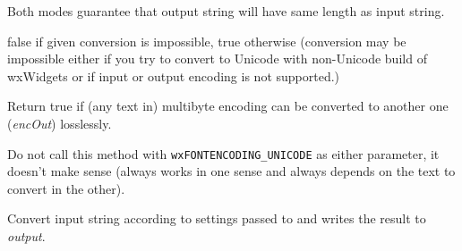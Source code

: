 \begin{twocollist}\itemsep=0pt
\end{twocollist}

Both modes guarantee that output string will have same length
as input string.


false if given conversion is impossible, true otherwise
(conversion may be impossible either if you try to convert
to Unicode with non-Unicode build of wxWidgets or if input
or output encoding is not supported.)


\label{wxencodingconvertercanconvert}


Return true if (any text in) multibyte encoding  can be converted to
another one ({\it encOut}) losslessly.

Do not call this method with \texttt{wxFONTENCODING\_UNICODE} as either
parameter, it doesn't make sense (always works in one sense and always depends
on the text to convert in the other).


\label{wxencodingconverterconvert}





Convert input string according to settings passed to
 and writes the result to {\it output}.



